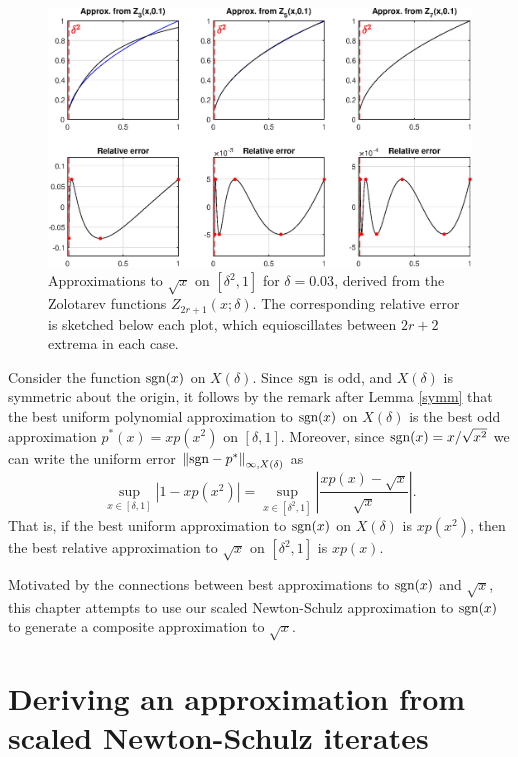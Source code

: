 \begin{figure}[t!]
\centering
   \includegraphics[width=\textwidth,height=\textheight,keepaspectratio]{figures/chapter_4/ZOLOTAREV_SQRT.eps}
   \caption{Approximations to $\sqrt{x}$ on $[\delta^2,1]$  for $\delta=0.03$, derived from the Zolotarev functions $Z_{2r+1}(x;\delta)$. The corresponding relative error is sketched below each plot, which equioscillates between $2r+2$ extrema in each case.}
   \label{fig:ZOLOT_SQRT}
\end{figure}

\begin{ex}\label{besties}
Consider the function $\text{sgn}(x)$ on $X(\delta)$. Since $\text{sgn}$ is odd, and $X(\delta)$ is symmetric about the origin, it follows by the remark after Lemma \ref{symm} that the best uniform polynomial approximation to $\text{sgn}(x)$ on $X(\delta)$ is the best odd approximation $p^*(x)=xp(x^2)$ on $[\delta,1]$. Moreover, since $\text{sgn}(x)=x/\sqrt{x^2}$ we can write the uniform error $\left\lVert\text{sgn}-p^*\right\rVert_{\infty,X(\delta)}$ as
\[\sup_{x\in [\delta,1]}|1 - xp(x^2)| = \sup_{x\in[\delta^2,1]}\left|\dfrac{xp(x)-\sqrt x}{\sqrt x}\right|.\]
That is, if the best uniform approximation to $\text{sgn}(x)$ on $X(\delta)$ is $xp(x^2)$, then the best relative approximation to $\sqrt{x}$ on $[\delta^2,1]$ is $xp(x)$.
\end{ex}

Motivated by the connections between best approximations to $\text{sgn}(x)$ and $\sqrt{x}$, this chapter attempts to use our scaled Newton-Schulz approximation to $\text{sgn}(x)$ to generate a composite approximation to $\sqrt{x}$.

\section{Deriving an approximation from scaled Newton-Schulz iterates}

